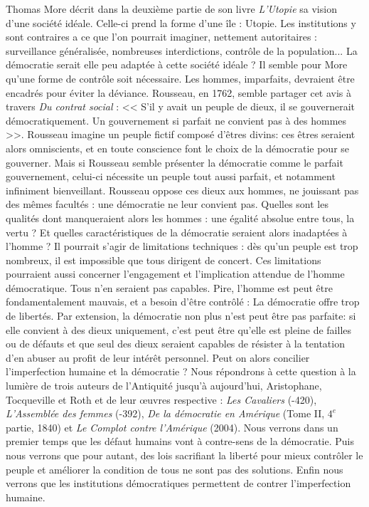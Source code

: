 \documentclass[a4paper]{article}
\newcommand{\cav}{\textit{Les Cavaliers }}
\newcommand{\adf}{\textit{L'Assemblée des femmes }}
\newcommand{\dda}{\textit{De la démocratie en Amérique }}
\newcommand{\cca}{\textit{Le Complot contre l'Amérique }}
\begin{document}
\pagestyle{fancy}
	
	Thomas More décrit dans la deuxième partie de son livre \textit{L'Utopie} sa vision d'une société idéale. Celle-ci prend la forme d'une île : Utopie. Les institutions y sont contraires a ce que l'on pourrait imaginer, nettement autoritaires : surveillance généralisée, nombreuses interdictions, contrôle de la population... La démocratie serait elle peu adaptée à cette société idéale ? Il semble pour More qu'une forme de contrôle soit nécessaire. Les hommes, imparfaits, devraient être encadrés pour éviter la déviance. Rousseau, en 1762, semble partager cet avis à travers \textit{Du contrat social} : << S'il y avait un peuple de dieux, il se gouvernerait démocratiquement. Un gouvernement si parfait ne convient pas à des hommes >>. Rousseau imagine un peuple fictif composé d'êtres divins: ces êtres seraient alors omniscients, et en toute conscience font le choix de la démocratie pour se gouverner. Mais si Rousseau semble présenter la démocratie comme le parfait gouvernement, celui-ci nécessite un peuple tout aussi parfait, et notamment infiniment bienveillant. Rousseau oppose ces dieux aux hommes, ne jouissant pas des mêmes facultés : une démocratie ne leur convient pas. Quelles sont les qualités dont manqueraient alors les hommes : une égalité absolue entre tous, la vertu ? Et quelles caractéristiques de la démocratie seraient alors inadaptées à l'homme ? Il pourrait s'agir de limitations techniques : dès qu'un peuple est trop nombreux, il est impossible que tous dirigent de concert. Ces limitations pourraient aussi concerner l'engagement et l'implication attendue de l'homme démocratique. Tous n'en seraient pas capables. Pire, l'homme est peut être fondamentalement mauvais, et a besoin d'être contrôlé : La démocratie offre trop de libertés. Par extension, la démocratie non plus n'est peut être pas parfaite: si elle convient à des dieux uniquement, c'est peut être qu'elle est pleine de failles ou de défauts et que seul des dieux seraient capables de résister à la tentation d'en abuser au profit de leur intérêt personnel. Peut on alors concilier l'imperfection humaine et la démocratie ? Nous répondrons à cette question à la lumière de trois auteurs de l'Antiquité jusqu'à aujourd'hui, Aristophane, Tocqueville et Roth et de leur œuvres respective : \cav (-420), \adf (-392), \dda (Tome II, \(4^{e}\) partie, 1840) et \cca (2004). Nous verrons dans un premier temps que les défaut humains vont à contre-sens de la démocratie. Puis nous verrons que pour autant, des lois sacrifiant la liberté pour mieux contrôler le peuple et améliorer la condition de tous ne sont pas des solutions. Enfin nous verrons que les institutions démocratiques permettent de contrer l'imperfection humaine.\\
\end{document}
